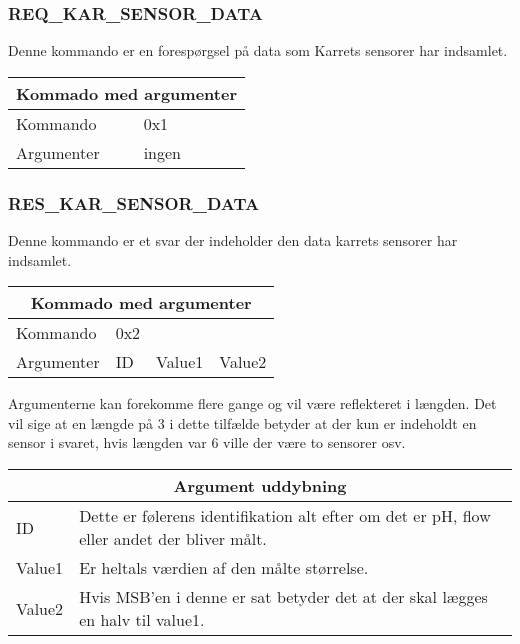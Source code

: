 \subsubsection{REQ\_KAR\_SENSOR\_DATA}
Denne kommando er en forespørgsel på data som Karrets sensorer har indsamlet.

\begin{table}[H]
\setlength{\parindent}{12pt}
\begin{tabular}{|l|lcc|}
\hline
\multicolumn{4}{|c|}{Kommado med argumenter}\\\hline
Kommando & 0x1 & & \\
Argumenter & ingen & & \\\hline
\end{tabular}
\end{table}



\subsubsection{RES\_KAR\_SENSOR\_DATA}
Denne kommando er et svar der indeholder den data karrets sensorer har indsamlet.

\begin{table}[H]
\setlength{\parindent}{12pt}
\begin{tabular}{|l|lcc|}
\hline
\multicolumn{4}{|c|}{Kommado med argumenter}\\\hline
Kommando & 0x2 & & \\
Argumenter & ID & Value1 & Value2 \\\hline
\end{tabular}
\end{table}

Argumenterne kan forekomme flere gange og vil være reflekteret i længden. Det vil sige at en længde på 3 i dette tilfælde betyder at der kun er indeholdt en sensor i svaret, hvis længden var 6 ville der være to sensorer osv.

\begin{table}[H]
\setlength{\parindent}{12pt}
\begin{tabular}{|l|l|}
\hline
\multicolumn{2}{|c|}{Argument uddybning}\\\hline
ID & Dette er følerens identifikation alt efter om det er pH, flow eller andet der bliver målt. \\
Value1 & Er heltals værdien af den målte størrelse. \\
Value2 & Hvis MSB'en i denne er sat betyder det at der skal lægges en halv til value1.\\\hline
\end{tabular}
\end{table}


